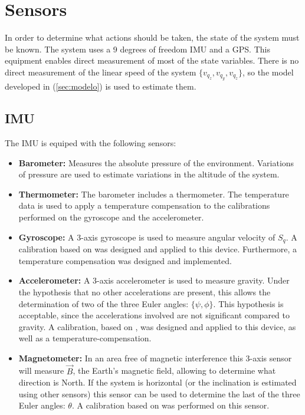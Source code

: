 \documentclass[conference]{IEEEtran}
\newcommand{\refp}[1]{(\ref{#1})}
\begin{document}
\section{Sensors}

In order to determine what actions should be taken, the state of the system must be known. The system uses a 9 degrees of freedom IMU and a GPS. This equipment enables direct measurement of most of the state variables. There is no direct measurement of the linear speed of the system $\{v_{q_z},v_{q_y},v_{q_z}\}$, so the model developed in \refp{sec:modelo} is used to estimate them. 

\subsection{IMU}
\label{sec:sensors-imu}

The IMU is equiped with the following sensors:
\begin{itemize}
\item \textbf{Barometer:} Measures the absolute pressure of the environment. Variations of pressure are used to estimate variations in the altitude of the system.
\item \textbf{Thermometer:} The barometer includes a thermometer. The temperature data is used to apply a temperature compensation to the calibrations performed on the gyroscope and the accelerometer.
\item \textbf{Gyroscope:} A 3-axis gyroscope is used to measure angular velocity of $S_q$. A calibration based on \cite{bib:calib_imu} was designed and applied to this device. Furthermore, a temperature compensation was designed and implemented.
\item \textbf{Accelerometer:} A 3-axis accelerometer is used to measure gravity. Under the hypothesis that no other accelerations are present, this allows the determination of two of the three Euler angles: $\{\psi, \phi\}$. This hypothesis is acceptable, since the accelerations involved are not significant compared to gravity. A calibration, based on \cite{bib:calib_imu}, was designed and applied to this device, as well as a temperature-compensation.
\item \textbf{Magnetometer:} In an area free of magnetic interference this 3-axis sensor will measure $\vec{B}$, the Earth's magnetic field, allowing to determine what direction is North. If the system is horizontal (or the inclination is estimated using other sensors) this sensor can be used to determine the last of the three Euler angles: $\theta$. A calibration based on \cite{bib:bola,bib:alain} was performed on this sensor.
\end{itemize}
\end{document}
